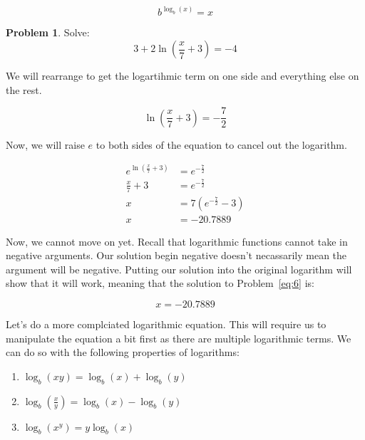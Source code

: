 \documentclass[12pt]{article}
\theoremstyle{definition}
\newtheorem{problem}{Problem}
\begin{document}
\begin{equation}
    b^{\log_b(x)} = x
\end{equation}

\begin{problem}
Solve:
\begin{equation*}
    3 + 2\ln\left(\frac{x}{7}+3\right) = -4 \label{eq:6}
\end{equation*}
\end{problem}

We will rearrange to get the logartihmic term on one side and everything else on the rest.

\begin{equation}
    \ln\left(\frac{x}{7}+3\right) = -\frac{7}{2}
\end{equation}

Now, we will raise $e$ to both sides of the equation to cancel out the logarithm.

\begin{align}
    e^{\ln\left(\frac{x}{7}+3\right)} & = e^{-\frac{7}{2}}      \\
    \frac{x}{7}+3                     & = e^{-\frac{7}{2}}      \\
    x                                 & = 7(e^{-\frac{7}{2}}-3) \\
    x                                 & = -20.7889
\end{align}

Now, we cannot move on yet.
Recall that logarithmic functions cannot take in negative arguments.
Our solution begin negative doesn't necassarily mean the argument will be negative.
Putting our solution into the original logarithm will show that it will work, meaning that the solution to Problem~\eqref{eq:6} is:

\begin{equation}
    x = -20.7889
\end{equation}

Let's do a more complciated logarithmic equation.
This will require us to manipulate the equation a bit first as there are multiple logarithmic terms.
We can do so with the following properties of logarithms:

\begin{enumerate}
    \item $\log_b(xy) = \log_b(x) + \log_b(y)$
    \item $\log_b\left(\frac{x}{y}\right) = \log_b(x) - \log_b(y)$
    \item $\log_b(x^y) = y\log_b(x)$
\end{enumerate}
\end{document}
